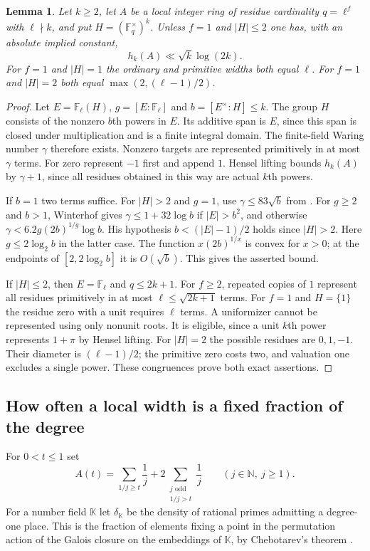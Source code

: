 \documentclass[11pt,letterpaper]{article}
\newtheorem{lemma}[lemma]{Lemma}
\theoremstyle{definition}
\numberwithin{equation}{section}
\begin{document}
\begin{lemma}\label{lem:uniform-tame-width}
Let $k\ge2$, let $A$ be a local integer ring of residue cardinality
$q=\ell^f$ with $\ell\nmid k$, and put $H=(\mathbb F_q^\times)^k$.
Unless $f=1$ and $|H|\le2$ one has, with an absolute implied constant,
\[
                       h_k(A)\ll\sqrt k\log(2k).
\]
For $f=1$ and $|H|=1$ the ordinary and primitive widths both equal
$\ell$. For $f=1$ and $|H|=2$ both equal $\max(2,(\ell-1)/2)$.
\end{lemma}
\begin{proof}
Let $E=\mathbb F_\ell(H)$, $g=[E:\mathbb F_\ell]$ and
$b=[E^\times:H]\le k$. The group $H$ consists of the nonzero $b$th
powers in $E$. Its additive span is $E$, since this span is closed
under multiplication and is a finite integral domain. The finite-field
Waring number $\gamma$ therefore exists. Nonzero targets are represented
primitively in at most $\gamma$ terms. For zero represent $-1$ first
and append $1$. Hensel lifting bounds $h_k(A)$ by $\gamma+1$,
since all residues obtained in this way are actual $k$th powers.

If $b=1$ two terms suffice. For $|H|>2$ and $g=1$, use
$\gamma\le83\sqrt b$ from \cite[Theorem~1.1]{hprimeCP}.
For $g\ge2$ and $b>1$, Winterhof \cite[Lemma~2 and Theorem~1]{htameWinterhof}
gives $\gamma\le1+32\log b$ if $|E|>b^2$, and otherwise
$\gamma<6.2g(2b)^{1/g}\log b$. His hypothesis $b<(|E|-1)/2$
holds since $|H|>2$. Here $g\le2\log_2 b$ in the latter case.
The function $x(2b)^{1/x}$ is convex for $x>0$; at the endpoints
of $[2,2\log_2 b]$ it is $O(\sqrt b)$. This gives the asserted bound.

If $|H|\le2$, then $E=\mathbb F_\ell$ and $q\le2k+1$. For $f\ge2$,
repeated copies of $1$ represent all residues primitively in at most
$\ell\le\sqrt{2k+1}$ terms. For $f=1$ and $H=\{1\}$ the residue
zero with a unit requires $\ell$ terms. A uniformizer cannot be
represented using only nonunit roots. It is eligible, since a unit
$k$th power represents $1+\pi$ by Hensel lifting. For $|H|=2$ the
possible residues are $0,1,-1$. Their diameter is $(\ell-1)/2$;
the primitive zero costs two, and valuation one excludes a single
power. These congruences prove both exact assertions.
\end{proof}

\subsection{How often a local width is a fixed fraction of the degree}
\label{sec:local-frequency}
For $0<t\le1$ set
\[
 A(t)=\sum_{1/j\ge t}\frac1j
                 +2\sum_{\substack{j\text{ odd}\\1/j>t}}\frac1j
                 \qquad(j\in\mathbb N,\ j\ge1).
\]
For a number field $\mathbb K$ let $\delta_{\mathbb K}$ be the density
of rational primes admitting a degree-one place. This is the fraction
of elements fixing a point in the permutation action of the Galois
closure on the embeddings of $\mathbb K$, by Chebotarev's theorem \cite{ednark}.
\end{document}
